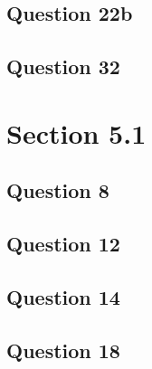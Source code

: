 \documentclass{article}
\begin{document}
\subsection{Question 22b}
\subsection{Question 32}

\section{Section 5.1}
\subsection{Question 8}
\subsection{Question 12}
\subsection{Question 14}
\subsection{Question 18}
\end{document}
